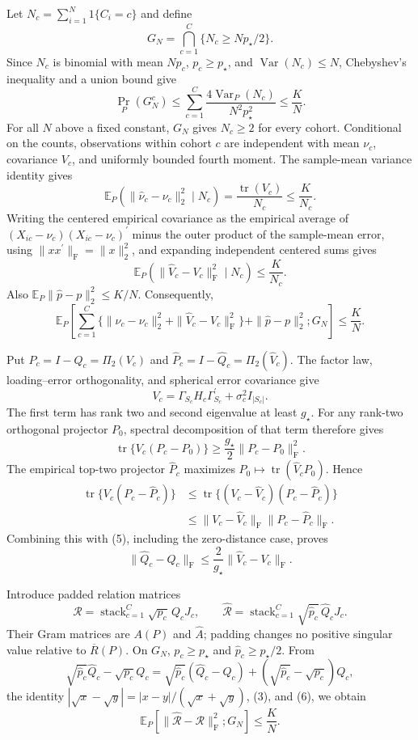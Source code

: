 Let \(N_c=\sum_{i=1}^N1\{C_i=c\}\) and define
\[
G_N=\bigcap_{c=1}^C\{N_c\geq Np_\star/2\}.
\]
Since \(N_c\) is binomial with mean \(Np_c\), \(p_c\geq p_\star\), and \(\operatorname{Var}(N_c)\leq N\), Chebyshev's inequality and a union bound give
\[
\Pr_P(G_N^c)
\leq\sum_{c=1}^C\frac{4\operatorname{Var}_P(N_c)}{N^2p_\star^2}
\leq\frac K N.
\tag{2}
\]
For all \(N\) above a fixed constant, \(G_N\) gives \(N_c\geq2\) for every cohort. Conditional on the counts, observations within cohort \(c\) are independent with mean \(\nu_c\), covariance \(V_c\), and uniformly bounded fourth moment. The sample-mean variance identity gives
\[
\mathbb E_P(\|\widehat\nu_c-\nu_c\|_2^2\mid N_c)
=\frac{\operatorname{tr}(V_c)}{N_c}\leq\frac K{N_c}.
\]
Writing the centered empirical covariance as the empirical average of \((X_{ic}-\nu_c)(X_{ic}-\nu_c)^{\prime}\) minus the outer product of the sample-mean error, using \(\|xx^{\prime}\|_{\mathrm F}=\|x\|_2^2\), and expanding independent centered sums gives
\[
\mathbb E_P(\|\widehat V_c-V_c\|_{\mathrm F}^2\mid N_c)
\leq\frac K{N_c}.
\]
Also \(\mathbb E_P\|\widehat p-p\|_2^2\leq K/N\). Consequently,
\[
\mathbb E_P\!\left[
\sum_{c=1}^C\{\|\widehat\nu_c-\nu_c\|_2^2
+\|\widehat V_c-V_c\|_{\mathrm F}^2\}
+\|\widehat p-p\|_2^2;G_N\right]
\leq\frac K N.
\tag{3}
\]

Put \(P_c=I-Q_c=\Pi_2(V_c)\) and \(\widehat P_c=I-\widehat Q_c=\Pi_2(\widehat V_c)\). The factor law, loading--error orthogonality, and spherical error covariance give
\[
V_c=\Gamma_{S_c}H_c\Gamma_{S_c}^{\prime}+\sigma_c^2I_{|S_c|}.
\tag{4}
\]
The first term has rank two and second eigenvalue at least \(g_\star\). For any rank-two orthogonal projector \(P_0\), spectral decomposition of that term therefore gives
\[
\operatorname{tr}\{V_c(P_c-P_0)\}
\geq\frac{g_\star}{2}\|P_c-P_0\|_{\mathrm F}^2.
\tag{5}
\]
The empirical top-two projector \(\widehat P_c\) maximizes \(P_0\mapsto\operatorname{tr}(\widehat V_cP_0)\). Hence
\[
\begin{aligned}
\operatorname{tr}\{V_c(P_c-\widehat P_c)\}
&\leq\operatorname{tr}\{(V_c-\widehat V_c)(P_c-\widehat P_c)\}\\
&\leq\|V_c-\widehat V_c\|_{\mathrm F}\|P_c-\widehat P_c\|_{\mathrm F}.
\end{aligned}
\]
Combining this with (5), including the zero-distance case, proves
\[
\|\widehat Q_c-Q_c\|_{\mathrm F}
\leq\frac{2}{g_\star}\|\widehat V_c-V_c\|_{\mathrm F}.
\tag{6}
\]

Introduce padded relation matrices
\[
\mathcal R=\operatorname{stack}_{c=1}^C\sqrt{p_c}\,Q_cJ_c,
\qquad
\widehat{\mathcal R}=\operatorname{stack}_{c=1}^C
\sqrt{\widehat p_c}\,\widehat Q_cJ_c.
\]
Their Gram matrices are \(A(P)\) and \(\widehat A\); padding changes no positive singular value relative to \(\overline R(P)\). On \(G_N\), \(p_c\geq p_\star\) and \(\widehat p_c\geq p_\star/2\). From
\[
\sqrt{\widehat p_c}\widehat Q_c-\sqrt{p_c}Q_c
=\sqrt{\widehat p_c}(\widehat Q_c-Q_c)
+(\sqrt{\widehat p_c}-\sqrt{p_c})Q_c,
\]
the identity \(|\sqrt x-\sqrt y|=|x-y|/(\sqrt x+\sqrt y)\), (3), and (6), we obtain
\[
\mathbb E_P[\|\widehat{\mathcal R}-\mathcal R\|_{\mathrm F}^2;G_N]
\leq\frac K N.
\tag{7}
\]

